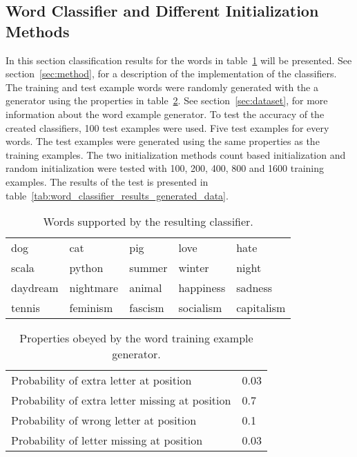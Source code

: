             


\subsection{Word Classifier and Different Initialization Methods}


In this section classification results for the words in table~\ref{tab:words_supported_by_classifier} will be presented. See section~\ref{sec:method}, for a description of the implementation of the classifiers. The training and test example words were randomly generated with the a generator using the properties in table~\ref{tab:word_generator_properties}. See section~\ref{sec:dataset}, for more information about the word example generator. To test the accuracy of the created classifiers, 100 test examples were used. Five test examples for every words. The test examples were generated using the same properties as the training examples. The two initialization methods count based initialization and random initialization were tested with 100, 200, 400, 800 and 1600 training examples. The results of the test is presented in table~\ref{tab:word_classifier_results_generated_data}.

\begin{table}[htb]
  \begin{center}
  \begin{tabular}{ l l l l l }
    dog      & cat       & pig     & love       & hate  \\
    scala    & python    & summer  & winter     & night  \\ 
    daydream & nightmare & animal  & happiness  & sadness \\ 
    tennis   & feminism  & fascism & socialism  & capitalism \\
  \end{tabular}
\end{center}
\caption{Words supported by the resulting classifier.} 
\label{tab:words_supported_by_classifier} 
\end{table}

\begin{table}[htb]
  \begin{center}
  \begin{tabular}{ l l }
    Probability of extra letter at position         & 0.03 \\
    Probability of extra letter missing at position & 0.7 \\ 
    Probability of wrong letter at position         & 0.1 \\ 
    Probability of letter missing at position       & 0.03 \\
  \end{tabular}
\end{center}
\caption{Properties obeyed by the word training example generator.} 
\label{tab:word_generator_properties} 
\end{table}

